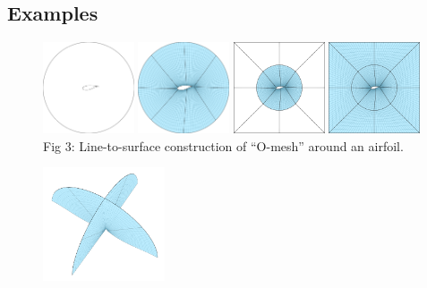 \documentclass[landscape]{sintefposter}
\begin{document}
\begin{multicols}{3}
\section{Examples}

\begin{figure}[ht]
  \begin{center}
    \includegraphics[width=0.24\textwidth]{Figures/tfi-1}
    \includegraphics[width=0.24\textwidth]{Figures/tfi-2}
    \includegraphics[width=0.24\textwidth]{Figures/tfi-3}
    \includegraphics[width=0.24\textwidth]{Figures/tfi-4} \\
    \small{
      Fig 3: Line-to-surface construction of ``O-mesh'' around an airfoil.
    }
  \end{center}
\end{figure}
\begin{figure}[ht]
  \begin{center}
    \includegraphics[width=0.32\textwidth]{Figures/wingtip-first}

\end{center}
\end{figure}
\end{multicols}
\end{document}
